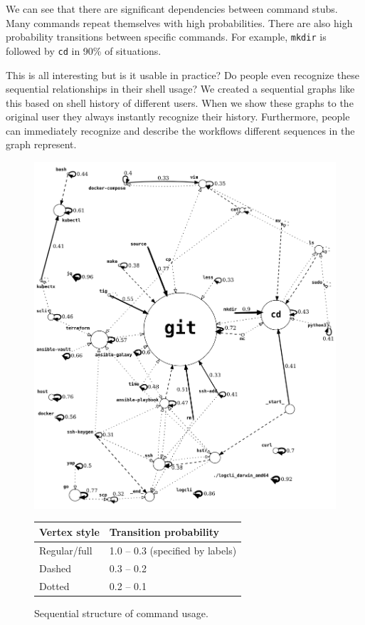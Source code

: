 \documentclass[thesis=M,english]{FITthesis}[2012/10/20]
\newcommand{\tmpframe}[1]{\fbox{#1}}
\renewcommand{\tmpframe}[1]{#1}
\begin{document}
We can see that there are significant dependencies between command stubs. Many commands repeat themselves with high probabilities. There are also high probability transitions between specific commands. For example, \verb|mkdir| is followed by \verb|cd| in 90\% of situations.

This is all interesting but is it usable in practice? Do people even recognize these sequential relationships in their shell usage?
We created a sequential graphs like this based on shell history of different users. When we show these graphs to the original user they always instantly recognize their history. Furthermore, people can immediately recognize and describe the workflows different sequences in the graph represent.

\begin{figure}

\tmpframe{\includegraphics[width=\linewidth]{figures/greenberg_new/graph_cmd-sequence_vit_41_0-1_crop.png}}
\centering
\begin{tabular}{|l|l|}
\hline
Vertex style & Transition probability            \\\hline
Regular/full     & 1.0 -- 0.3 (specified by labels) \\
Dashed      & 0.3 -- 0.2                         \\
Dotted      & 0.2 -- 0.1                         \\
\hline
\end{tabular}

\caption{Sequential structure of command usage.}
\label{seq-graph}
\end{figure}
\end{document}
